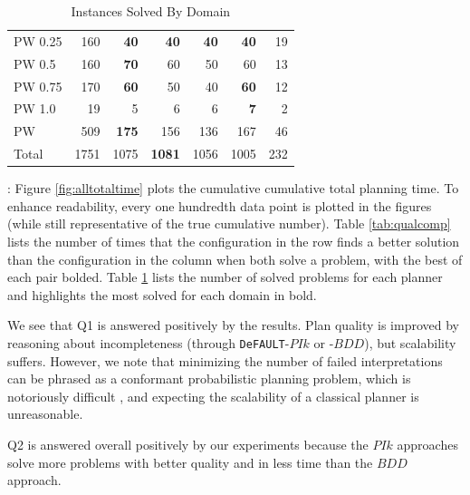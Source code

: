 \documentclass[letterpaper]{article}
\def\und#1{\noindent{\bf #1}:}
\def\FFRISKY{{\tt DeFAULT}}
\def\citep#1{\cite{#1}}
\begin{document}
\begin{table}[t]
\begin{tabular}{|l|r|r@{ }r@{ }r@{ }r|r|}
PW 0.25 	&		160		&	{\bf	40}	&	{\bf	40}	&	{\bf	40}	&	{\bf	40}	&	19	\\	
PW 0.5 	&		160		&	{\bf	70}	&		60		&		50		&		60		&	13	\\	
PW 0.75 	&		170		&	{\bf	60}	&		50		&		40		&	{\bf	60}	&	12	\\	
PW 1.0 	&		19		&		5		&		6		&		6		&	{\bf	7}	&	2	\\	\hline
PW 	&		509		&	{\bf	175}	&		156		&		136		&		167		&	46	\\	\hline\hline
Total	&		1751		&		1075		&	{\bf	1081}	&		1056		&		1005		&	232	\\	
\hline																								
\end{tabular}	\caption{\label{tab:solved} Instances Solved By Domain}																							
\end{table}																																												



\und{Off-line Planning Results} Figure \ref{fig:alltotaltime} plots the
cumulative cumulative total planning time.  To enhance readability, every one
hundredth data point is plotted in the figures (while still representative of the true cumulative
number).  Table \ref{tab:qualcomp} lists the number of times that the
configuration in the row finds a better solution than the configuration in the
column when both solve a problem, with the best of each pair bolded. Table
\ref{tab:solved} lists the number of solved problems for each planner and
highlights the most solved for each domain in bold. 

We see that Q1 is answered positively by the results.  Plan quality is
improved by reasoning about incompleteness (through \FFRISKY{}-$PIk$ or -$BDD$),
but scalability suffers.  However, we note that minimizing the number of failed
interpretations  can be phrased as a conformant probabilistic
planning problem, which is notoriously difficult \citep{pff,aij-mclug}, and
expecting the scalability of a classical planner is  unreasonable.

Q2 is answered overall positively by our experiments because the $PIk$
approaches solve more problems with better quality and in less time than the
$BDD$ approach.  
\end{document}
